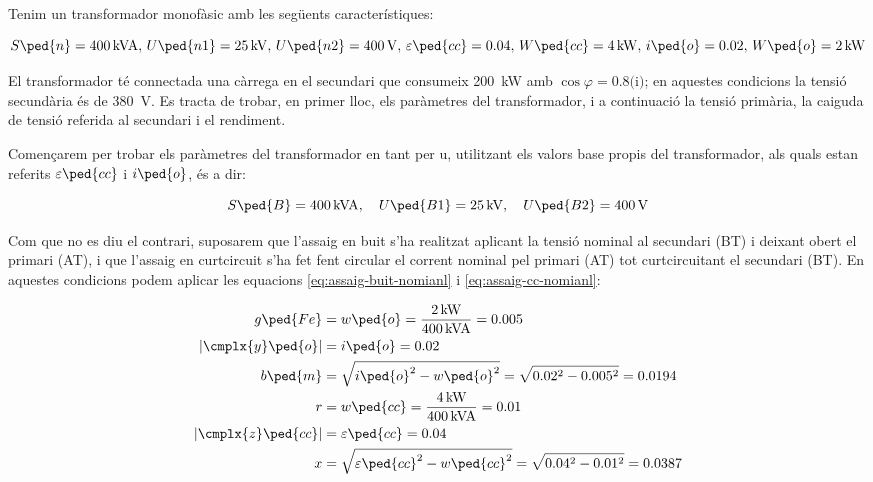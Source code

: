 \begin{exemple}\label{ex:ParamTrafo}
	\addcontentsxms{\ParamTrafo}
    Tenim un transformador monofàsic amb les següents característiques:

    \[S\ped{n}=\qty{400}{kVA},\,U\ped{n1}=\qty{25}{kV},\, U\ped{n2}=\qty{400}{V},\, \varepsilon\ped{cc}=\num{0,04},\, W\ped{cc}=\qty{4}{kW},\, i\ped{o}=\num{0,02},\,  W\ped{o}=\qty{2}{kW}\]

     El transformador té connectada una càrrega en el secundari que consumeix \qty{200}{kW} amb $\cos{\varphi}=\num{0,8}\text{(i)}$; en aquestes condicions la tensió secundària és de \qty{380}{V}.
    Es tracta de trobar, en primer lloc, els paràmetres del transformador, i a continuació la tensió primària, la caiguda de tensió referida al secundari i el rendiment.

    Començarem per trobar els paràmetres del transformador en tant per u, utilitzant els valors base propis del transformador, als quals estan referits $\varepsilon\ped{cc}$ i $i\ped{o}$, és a dir:

    \[ S\ped{B}=\qty{400}{kVA},\quad U\ped{B1}=\qty{25}{kV},\quad U\ped{B2}=\qty{400}{V}\]

    Com que no es diu el contrari, suposarem que l'assaig en buit s'ha realitzat aplicant la tensió nominal al secundari (BT) i deixant obert el primari (AT), i que l'assaig en curtcircuit s'ha fet fent circular el corrent nominal pel primari (AT) tot curtcircuitant el secundari (BT). En aquestes condicions podem aplicar les equacions \eqref{eq:assaig-buit-nomianl} i \eqref{eq:assaig-cc-nomianl}:

   \begin{align*}
        g\ped{Fe} &= w\ped{o} = \frac{\qty{2}{kW}}{\qty{400}{kVA}} = \num{0,005} \\
        |\cmplx{y}\ped{o}| &= i\ped{o}  = \num{0,02} \\
        b\ped{m} &= \sqrt{i\ped{o}^2 - w\ped{o}^2} = \sqrt{\num{0,02}^2 - \num{0,005}^2} = \num{0,0194}\\
        r &= w\ped{cc} = \frac{\qty{4}{kW}}{\qty{400}{kVA}} = \num{0,01} \\
        |\cmplx{z}\ped{cc}| &=  \varepsilon\ped{cc} = \num{0,04} \\
        x &= \sqrt{\varepsilon\ped{cc}^2 - w\ped{cc}^2} = \sqrt{\num{0,04}^2-\num{0,01}^2} = \num{0,0387}
  \end{align*}


\end{exemple}
